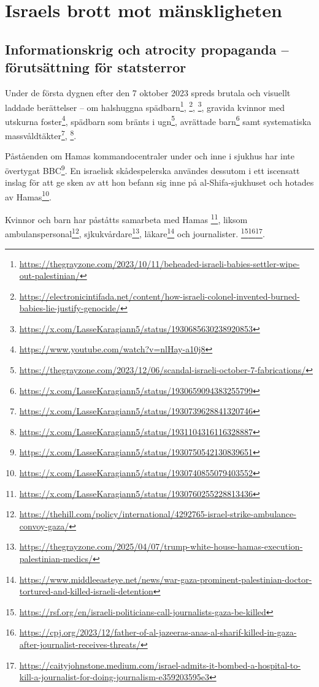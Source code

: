 
%

\newpage

\section{Israels brott mot mänskligheten}

\subsection{Informationskrig och atrocity propaganda – förutsättning för statsterror}



Under de första dygnen efter den 7 oktober 2023 spreds brutala och visuellt laddade berättelser – om halshuggna spädbarn\footnote{\url{https://thegrayzone.com/2023/10/11/beheaded-israeli-babies-settler-wipe-out-palestinian/}}, 
\footnote{\url{https://electronicintifada.net/content/how-israeli-colonel-invented-burned-babies-lie-justify-genocide/}}, 
\footnote{\url{https://x.com/LasseKaragiann5/status/1930685630238920853}}, 
gravida kvinnor med utskurna foster\footnote{\url{https://www.youtube.com/watch?v=nlHay-a10j8}}, 
spädbarn som bränts i ugn\footnote{\url{https://thegrayzone.com/2023/12/06/scandal-israeli-october-7-fabrications/}}, 
avrättade barn\footnote{\url{https://x.com/LasseKaragiann5/status/1930659094383255799}} samt 
systematiska massvåldtäkter\footnote{\url{https://x.com/LasseKaragiann5/status/1930739628841320746}}, 
\footnote{\url{https://x.com/LasseKaragiann5/status/1931104316116328887}}.



Påståenden om Hamas kommandocentraler under och inne i sjukhus har inte övertygat BBC\footnote{\url{https://x.com/LasseKaragiann5/status/1930750542130839651}}. En israelisk skådespelerska användes dessutom i ett iscensatt inslag för att ge sken av att hon befann sig inne på al-Shifa-sjukhuset och hotades av Hamas\footnote{\url{https://x.com/LasseKaragiann5/status/1930740855079403552}}.

Kvinnor och barn har påståtts samarbeta med Hamas \footnote{\url{https://x.com/LasseKaragiann5/status/1930760255228813436}}, liksom ambulanspersonal\footnote{\url{https://thehill.com/policy/international/4292765-israel-strike-ambulance-convoy-gaza/}}, sjkukvårdare\footnote{\url{https://thegrayzone.com/2025/04/07/trump-white-house-hamas-execution-palestinian-medics/}}, läkare\footnote{\url{https://www.middleeasteye.net/news/war-gaza-prominent-palestinian-doctor-tortured-and-killed-israeli-detention}} och journalister.
\footnote{\url{https://rsf.org/en/israeli-politicians-call-journalists-gaza-be-killed}}\footnote{\url{https://cpj.org/2023/12/father-of-al-jazeeras-anas-al-sharif-killed-in-gaza-after-journalist-receives-threats/}}\footnote{\url{https://caityjohnstone.medium.com/israel-admits-it-bombed-a-hospital-to-kill-a-journalist-for-doing-journalism-e359203595e3}}. 





